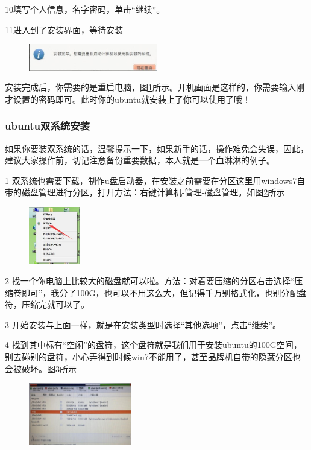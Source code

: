 \documentclass[12pt]{article}
\begin{document}
  10填写个人信息，名字密码，单击“继续”。

  11进入到了安装界面，等待安装

\begin{figure}[!htb] %
\centering
\includegraphics[width=0.5\textwidth]{tu14.jpeg}
\caption{}
\label{tu14}
\end{figure} 

安装完成后，你需要的是重启电脑，图\ref{tu14}所示。开机画面是这样的，你需要输入刚才设置的密码即可。此时你的ubuntu就安装上了你可以使用了哦！

\subsubsection{ubuntu双系统安装}

如果你要装双系统的话，{\color{red}温馨提示一下}，{\color{blue}如果新手的话，操作难免会失误，因此，建议大家操作前，切记注意备份重要数据，本人就是一个血淋淋的例子}。

 1 双系统也需要下载，制作u盘启动器，在安装之前需要在分区这里用windows7自带的磁盘管理进行分区，打开方法：右键计算机-管理-磁盘管理。如图\ref{tu21}所示
\begin{figure}[!htb] %
\centering
\includegraphics[width=0.2\textwidth]{tu21.jpeg}
\caption{}
\label{tu21}
\end{figure} 

 2 找一个你电脑上比较大的磁盘就可以啦。方法：对着要压缩的分区右击选择“压缩卷即可”，我分了100G，也可以不用这么大，但记得千万别格式化，也别分配盘符，压缩完就可以了。

 3 开始安装与上面一样，就是在安装类型时选择“其他选项”，点击“继续”。

 4 找到其中标有“空闲”的盘符，这个盘符就是我们用于安装ubuntu的100G空间，别去碰别的盘符，小心弄得到时候win7不能用了，甚至品牌机自带的隐藏分区也会被破坏。图\ref{tu23}所示
\begin{figure}[!htb] %
\centering
\includegraphics[width=0.4\textwidth]{tu23.jpeg}
\caption{}
\label{tu23}
\end{figure} 
\end{document}
